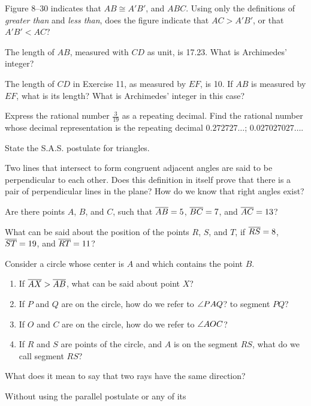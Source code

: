 \documentclass[11pt]{book}
\begin{document}
\begin{exlist}
\item[10.] Figure 8--30 indicates that $AB \cong A'B'$, and $ABC$. Using only
  the definitions of \emph{greater than} and \emph{less than}, does the figure
  indicate that $AC > A'B'$, or that $A'B' < AC$?
\exfig{\FIGVIIITHIRTY}
\item[11.] The length of $AB$, measured with $CD$ as unit, is 17.23. What is
  Archimedes' integer?
\item[12.] The length of $CD$ in Exercise 11, as measured by $EF$, is 10. If
  $AB$ is measured by $EF$, what is its length? What is Archimedes' integer in
  this case?
\item[13.] Express the rational number $\tfrac{3}{19}$ as a repeating decimal.
  Find the rational number whose decimal representation is the repeating
  decimal $0.272727\ldots$; $0.027027027\ldots$.
\item[14.] State the S.A.S. postulate for triangles.
\item[15.] Two lines that intersect to form congruent adjacent angles are said
  to be perpendicular to each other. Does this definition in itself prove that
  there is a pair of perpendicular lines in the plane? How do we know that
  right angles exist?
\item[16.] Are there points $A$, $B$, and $C$, such that $\overline{AB} = 5$,
  $\overline{BC} = 7$, and $\overline{AC} = 13$?
\item[17.] What can be said about the position of the points $R$, $S$, and
  $T$, if $\overline{RS} = 8$, $\overline{ST} = 19$, and $\overline{RT} = 11$?
\item[18.] Consider a circle whose center is $A$ and which contains the point
  $B$.
  \begin{enumerate}[label=(\alph*), leftmargin=1.8em, topsep=2pt, itemsep=1pt]
    \item If $\overline{AX} > \overline{AB}$, what can be said about point $X$?
    \item If $P$ and $Q$ are on the circle, how do we refer to $\angle PAQ$? to
      segment $PQ$?
    \item If $O$ and $C$ are on the circle, how do we refer to $\angle AOC$?
    \item If $R$ and $S$ are points of the circle, and $A$ is on the segment
      $RS$, what do we call segment $RS$?
  \end{enumerate}
\item[19.] What does it mean to say that two rays have the same direction?
\item[\stex 20.] Without using the parallel postulate or any of its

\end{exlist}
\end{document}
